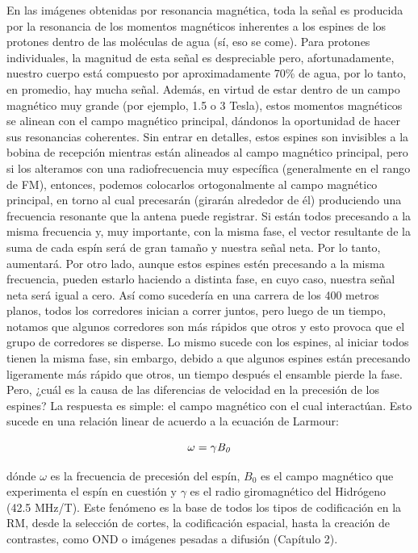 \documentclass[12pt,a5,twoside]{book}
\begin{document}
En las imágenes obtenidas por resonancia magnética, toda la señal es producida por la resonancia de los momentos magnéticos inherentes a los espines de los protones dentro de las moléculas de agua (sí, eso se come). Para protones individuales, la magnitud de esta señal es despreciable pero, afortunadamente, nuestro cuerpo está compuesto por aproximadamente 70\% de agua, por lo tanto, en promedio, hay mucha señal. Además, en virtud de estar dentro de un campo magnético muy grande (por ejemplo, 1.5 o 3 Tesla), estos momentos magnéticos se alinean con el campo magnético principal, dándonos la oportunidad de hacer sus resonancias coherentes. Sin entrar en detalles, estos espines son invisibles a la bobina de recepción mientras están alineados al campo magnético principal, pero si los alteramos con una radiofrecuencia muy específica (generalmente en el rango de FM), entonces, podemos colocarlos ortogonalmente al campo magnético principal, en torno al cual precesarán (girarán alrededor de él) produciendo una frecuencia resonante que la antena puede registrar. Si están todos precesando a la misma frecuencia y, muy importante, con la misma fase, el vector resultante de la suma de cada espín será de gran tamaño y nuestra señal neta. Por lo tanto, aumentará. Por otro lado, aunque estos espines estén precesando a la misma frecuencia, pueden estarlo haciendo a distinta fase, en cuyo caso, nuestra señal neta será igual a cero. Así como sucedería en una carrera de los 400 metros planos, todos los corredores inician a correr juntos, pero luego de un tiempo, notamos que algunos corredores son más rápidos que otros y esto provoca que el grupo de corredores se disperse. Lo mismo sucede con los espines, al iniciar todos tienen la misma fase, sin embargo, debido a que algunos espines están precesando ligeramente más rápido que otros, un tiempo después el ensamble pierde la fase. Pero, ¿cuál es la causa de las diferencias de velocidad en la precesión de los espines? La respuesta es simple: el campo magnético con el cual interactúan. Esto sucede en una relación linear de acuerdo a la ecuación de Larmour:

\begin{equation} 
\omega = \gamma \it{B_{0}} 
\end{equation} 

dónde \(\omega\) es la frecuencia de precesión del espín, \(B_{0}\) es el campo magnético que experimenta el espín en cuestión y \(\gamma\) es el radio giromagnético del Hidrógeno (42.5 MHz/T). Este fenómeno es la base de todos los tipos de codificación en la RM, desde la selección de cortes, la codificación espacial, hasta la creación de contrastes, como OND o imágenes pesadas a difusión (Capítulo 2).
\end{document}
